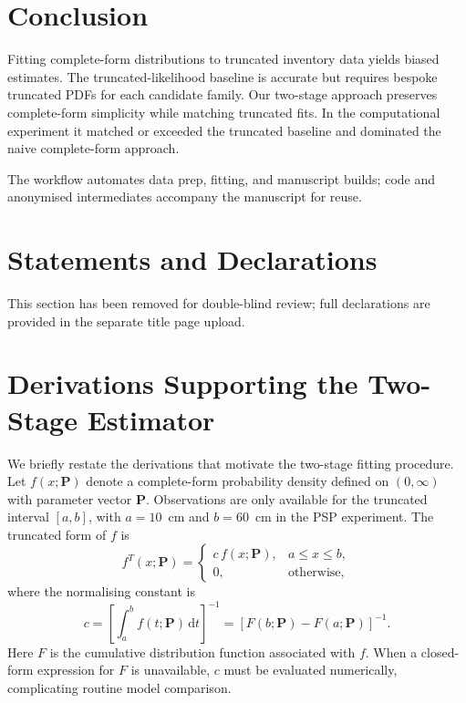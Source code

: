 \documentclass[12pt]{article}
\providecommand{\DIFaddend}{} %
\DeclareRobustCommand{\DIFaddend}{\DIFOaddend \let\includegraphics\DIFOincludegraphics} %
\begin{document}
\DIFaddend %
\section{Conclusion}

\label{sec:conclusion}

Fitting complete-form distributions to truncated inventory data yields biased estimates. The truncated-likelihood baseline is accurate but requires bespoke truncated PDFs for each candidate family. Our two-stage approach preserves complete-form simplicity while matching truncated fits. In the computational experiment it matched or exceeded the truncated baseline and dominated the naive complete-form approach.

The workflow automates data prep, fitting, and manuscript builds; code and anonymised intermediates accompany the manuscript for reuse.


\section*{Statements and Declarations}
This section has been removed for double-blind review; full declarations are provided in the separate title page upload.

\appendix
\section{Derivations Supporting the Two-Stage Estimator}

We briefly restate the derivations that motivate the two-stage fitting procedure. Let $f(x; \bm{P})$ denote a complete-form probability density defined on $(0, \infty)$ with parameter vector $\bm{P}$. Observations are only available for the truncated interval $[a, b]$, with $a = 10$~cm and $b = 60$~cm in the PSP experiment. The truncated form of $f$ is
\begin{equation}
  f^{T}(x; \bm{P}) =
    \begin{cases}
      c \, f(x; \bm{P}), & a \leq x \leq b, \\
      0, & \text{otherwise},
    \end{cases}
    \label{eq:truncated-density}
\end{equation}
where the normalising constant is
\begin{equation}
  c = \left[\int_a^b f(t; \bm{P}) \,\mathrm{d}t\right]^{-1} = \left[F(b; \bm{P}) - F(a; \bm{P})\right]^{-1}.
\end{equation}
Here $F$ is the cumulative distribution function associated with $f$. When a closed-form expression for $F$ is unavailable, $c$ must be evaluated numerically, complicating routine model comparison.
\end{document}
